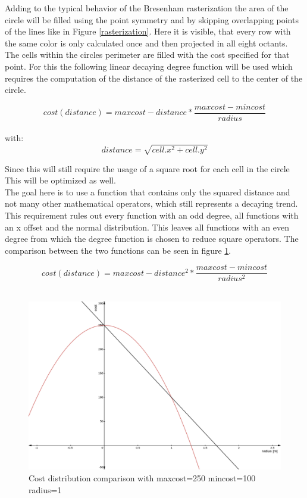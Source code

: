 Adding to the typical behavior of the Bresenham rasterization the area of the circle will be filled using the point symmetry and by skipping overlapping points of the lines like in Figure \ref{rasterization}. Here it is visible, that every row with the same color is only calculated once and then projected in all eight octants. 
The cells within the circles perimeter are filled with the cost specified for that point. For this the following linear decaying  degree function will be used which requires the computation of the distance of the rasterized cell to the center of the circle.

\[cost(distance)=maxcost-distance*\frac{maxcost-mincost}{radius}\]\\
with: \[distance=\sqrt{cell.x^2+cell.y^2}\]

 Since this will still require the usage of a square root for each cell in the circle This will be optimized as well.\\

The goal here is to use a function that contains only the squared distance and not many other mathematical operators, which still represents a decaying trend. This requirement rules out every function with an odd degree, all functions with an x offset and the normal distribution. This leaves all functions with an even degree from which the  degree function is chosen to reduce square operators. The comparison between the two functions can be seen in figure \ref{distrcomp}.

\[cost(distance)=maxcost-distance^2*\frac{maxcost-mincost}{radius^2}\]\\

\begin{figure} 
	\begin{center}
	\includegraphics[width=140mm]{Pictures/linear cost comparison}
	\caption{Cost distribution comparison with maxcost=250 mincost=100 radius=1}
	\end{center}
	\label{distrcomp}
\end{figure}

